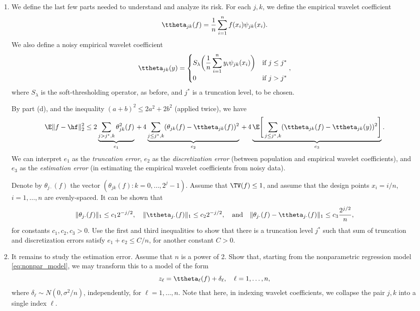\documentclass{article}
\begin{document}
\begin{enumerate}[label=(\alph*)]
\item We define the last few parts needed to understand \smash{$\hf$} and 
  analyze its risk. For each $j,k$, we define the empirical wavelet coefficient 
  \[
  \ttheta_{jk}(f) = \frac{1}{n} \sum_{i=1}^n f(x_i) \psi_{jk}(x_i).
  \] 
  We also define a noisy empirical wavelet coefficient 
  \[
  \ttheta_{jk}(y) = \begin{cases}
  \displaystyle
  S_\lambda \bigg( \frac{1}{n} \sum_{i=1}^n y_i \psi_{jk}(x_i) 
  \bigg) & \text{if $j \leq j^*$} \\
  0 & \text{if $j > j ^*$}
  \end{cases},
  \]
  where $S_\lambda$ is the soft-thresholding operator, as before, and $j^*$ is a
  truncation level, to be chosen. 

  By part (d), and the inequality $(a+b)^2 \leq 2a^2 + 2b^2$ (applied twice), we
  have 
  \[
  \E \|f - \hf\|_2^2 \leq 2\underbrace{\sum_{j > j^*,k} \theta_{jk}^2(f)}_{e_1}  
  \,+\,
  4\underbrace{\sum_{j \leq j^*,k} (\theta_{jk}(f) - \ttheta_{jk}(f))^2}_{e_2}
  \,+\, 
  4\underbrace{\E\Bigg[ \sum_{j \leq j^*,k} (\ttheta_{jk}(f) -
    \ttheta_{jk}(y))^2 \Bigg]}_{e_3}. 
  \]
  We can interpret $e_1$ as the \emph{truncation error}, $e_2$ as the
  \emph{discretization error} (between population and empirical wavelet
  coefficients), and $e_3$ as the \emph{estimation error} (in estimating the
  empirical wavelet coefficients from noisy data). 
  
  Denote by $\theta_{j \cdot}(f)$ the vector $(\theta_{jk}(f) : k =
  0,\dots,2^j-1)$. Assume that $\TV(f) \leq 1$, and assume that the design
  points $x_i = i/n$, $i=1,\dots,n$ are evenly-spaced. It can be shown that 
  \begin{equation}
  \label{eq:besov_condition}
  \| \theta_{j \cdot}(f) \|_1 \leq c_1 2^{-j/2}, \quad
  \| \ttheta_{j \cdot}(f) \|_1 \leq c_2 2^{-j/2}, \quad \text{and} \quad 
  \| \theta_{j \cdot}(f) - \ttheta_{j \cdot}(f) \|_1 \leq c_3 \frac{2^{j/2}}{n}, 
  \end{equation}
  for constants $c_1,c_2,c_3> 0$. Use the first and third inequalities to show 
  that there is a truncation level $j^*$ such that sum of truncation and
  discretization errors satisfy $e_1 + e_2 \leq C/n$, for another constant
  $C>0$.       
  \marginpar{\small [2 pts]}

\item It remains to study the estimation error. Assume that $n$ is a power of
  2. Show that, starting from the nonparametric regression model
  \eqref{eq:nonpar_model}, we may transform this to a model of the form   
  \marginpar{\small [3 pts]}
  \[
  z_\ell = \ttheta_\ell(f) + \delta_\ell, \quad \ell=1,\dots,n,
  \]
  where $\delta_\ell \sim N(0,\sigma^2/n)$, independently, for
  $\ell=1,\dots,n$. Note that here, in indexing wavelet coefficients, we
  collapse the pair $j,k$ into a single index $\ell$. 


\end{enumerate}
\end{document}

